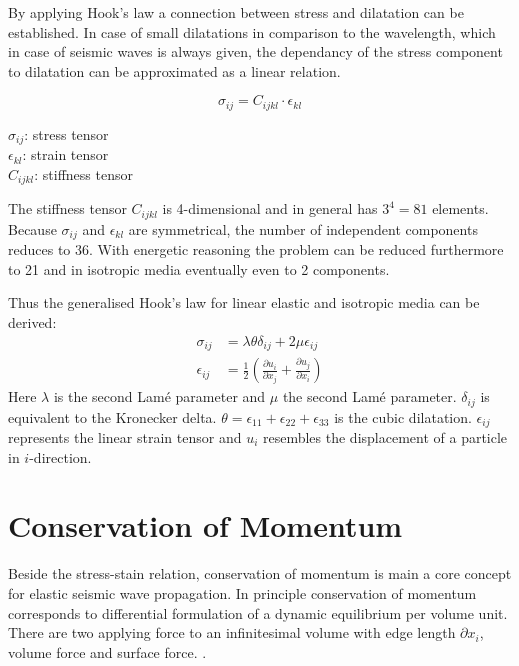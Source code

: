 \documentclass[pdftex,a4paper,parskip,listof=totoc,bibliography=totoc,onehalfspacing,12pt]{scrreprt}
\begin{document}
By applying Hook's law a connection between stress and dilatation  can be established. In case of small dilatations in comparison to the wavelength, which in case of seismic waves is always given, the dependancy of the stress component to dilatation can be approximated as a linear relation.
\begin{minipage}[t]{0.4\textwidth}
\begin{equation}
	\sigma_{ij} = C_{ijkl} \cdot\epsilon_{kl}
\end{equation}
\end{minipage}
\hfill
\begin{minipage}[t]{0.45\textwidth}
$\sigma_{ij}$: stress tensor\\
$\epsilon_{kl}$: strain tensor\\
$C_{ijkl}$: stiffness tensor
\end{minipage}
The stiffness tensor $C_{ijkl}$ is \num{4}-dimensional and in general has $3^4 = 81$ elements. Because $\sigma_{ij}$ and $\epsilon_{kl}$ are symmetrical, the number of independent components reduces to \num{36}. With energetic reasoning the problem can be reduced furthermore to \num{21} and in isotropic media eventually even to \num{2} components. 

Thus the generalised Hook's law for linear elastic and isotropic media can be derived:
\begin{align}
	\sigma_{ij} &= \lambda \theta \delta_{ij} + 2 \mu \epsilon_{ij}\label{eqn:GenHook}\\
	\epsilon_{ij} &= \frac{1}{2} \left( \frac{\partial u_i}{\partial x_j} + \frac{\partial u_j}{\partial x_i} \right)\label{eqn:Dehnij}
\end{align}
Here $\lambda$ is the second Lam\'{e} parameter and $\mu$ the second Lam\'{e} parameter. $\delta_{ij}$ is equivalent to the Kronecker delta. $\theta=\epsilon_{11} + \epsilon_{22} + \epsilon_{33}$ is the cubic dilatation. $\epsilon_{ij}$ represents the linear strain tensor and $u_i$ resembles the displacement of a particle in $i$-direction.

\section{Conservation of Momentum}

Beside the stress-stain relation, conservation of momentum is main a core concept for elastic seismic wave propagation. In principle conservation of momentum corresponds to differential formulation of a dynamic equilibrium per volume unit. There are two applying force to an infinitesimal volume with edge length $\partial x_i$, volume force and surface force. \citep{landau1997lehrbuch}.
\end{document}
